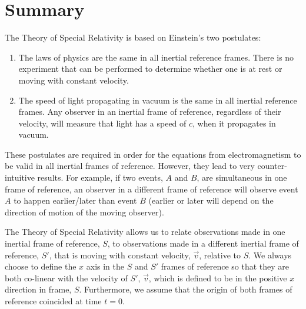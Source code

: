 \section{Summary}
\begin{chapterSummary}
The Theory of Special Relativity is based on Einstein's two postulates:
\begin{enumerate}
\item The laws of physics are the same in all inertial reference frames. There is no experiment that can be performed to determine whether one is at rest or moving with constant velocity.
\item The speed of light propagating in vacuum is the same in all inertial reference frames. Any observer in an inertial frame of reference, regardless of their velocity, will measure that light has a speed of $c$, when it propagates in vacuum. 
\end{enumerate}
These postulates are required in order for the equations from electromagnetism to be valid in all inertial frames of reference. However, they lead to very counter-intuitive results. For example, if two events, $A$ and $B$, are simultaneous in one frame of reference, an observer in a different frame of reference will observe event $A$ to happen earlier/later than event $B$ (earlier or later will depend on the direction of motion of the moving observer).  

The Theory of Special Relativity allows us to relate observations made in one inertial frame of reference, $S$, to observations made in a different inertial frame of reference, $S'$, that is moving with constant velocity, $\vec v$, relative to $S$. We always choose to define the $x$ axis in the $S$ and $S'$ frames of reference so that they are both co-linear with the velocity of $S'$, $\vec v$, which is defined to be in the positive $x$ direction in frame, $S$. Furthermore, we assume that the origin of both frames of reference coincided at time $t=0$. 


\end{chapterSummary}

